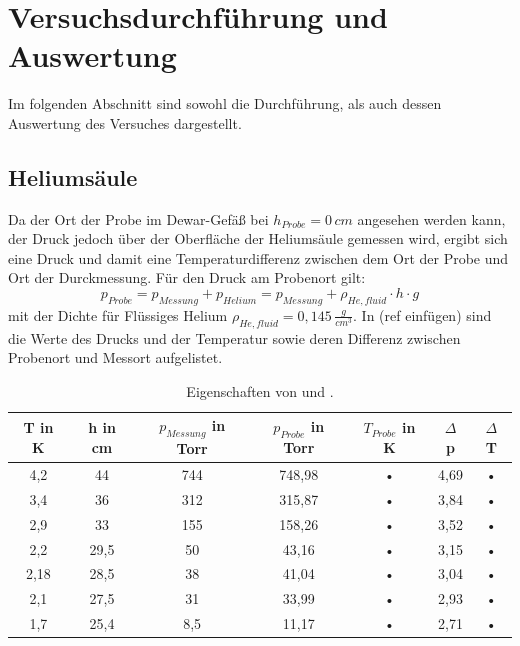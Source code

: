 \documentclass[twoside,colorback,accentcolor=tud4c,11pt]{tudreport}
\begin{document}
\chapter{Versuchsdurchführung und Auswertung}
Im folgenden Abschnitt sind sowohl die Durchführung, als auch dessen Auswertung des Versuches dargestellt.
\section{Heliumsäule}
Da der Ort der Probe im Dewar-Gefäß bei $h_{Probe}=0\,\si{cm}$ angesehen werden kann, der Druck jedoch über der Oberfläche der Heliumsäule gemessen wird, ergibt sich eine Druck und damit eine Temperaturdifferenz zwischen dem Ort der Probe und Ort der Durckmessung. Für den Druck am Probenort gilt:
\begin{equation}
p_{Probe}=p_{Messung}+p_{Helium}=p_{Messung}+\rho_{He,fluid}\cdot h \cdot g
\end{equation}
mit der Dichte für Flüssiges Helium $\rho_{He,fluid}=0,145\,\si{\frac{g}{cm^3}}$. In (ref einfügen) sind die Werte des Drucks und der Temperatur sowie deren Differenz zwischen Probenort und Messort aufgelistet.
\begin{table}[H]
\centering
\begin{tabular}{|c|c|c|c|c|c|c|}
\hline 
T in K & h in cm & $p_{Messung}$ in Torr & $p_{Probe}$ in Torr & $T_{Probe}$ in K & $\Delta$ p & $\Delta$ T\\ 
\hline 
4,2 & 44 & 744 & 748,98 & • & 4,69 & • \\ 
\hline 
3,4 & 36 & 312 & 315,87 & • & 3,84 & • \\ 
\hline 
2,9 & 33 & 155 & 158,26 & • & 3,52 & • \\ 
\hline 
2,2 & 29,5 & 50 & 43,16 & • & 3,15 & • \\ 
\hline 
2,18 & 28,5 & 38 & 41,04 & • & 3,04 & • \\ 
\hline 
2,1 & 27,5 & 31 & 33,99 & • & 2,93 & • \\ 
\hline 
1,7 & 25,4 & 8,5 & 11,17 & • & 2,71 & • \\ 
\hline 
\end{tabular}
\caption{Eigenschaften von  und .}\label{tab:He}
\end{table} 
\end{document}
